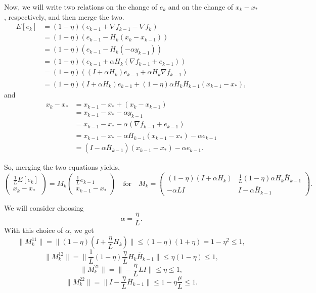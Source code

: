 \documentclass[11pt]{article}
\begin{document}
\noindent 
Now, we will write two relations on the change of $e_k$ and on the change of $x_k-x_\ast$, respectively, and then merge the two.
 \begin{align*}
  E[e_k] &= (1-\eta)(e_{k-1} + \nabla f_{k-1} - \nabla f_k)\\
  &= (1-\eta)(e_{k-1} - H_k(x_k-x_{k-1}))\\
  &= (1-\eta)(e_{k-1} - H_k(-\alpha y_{k-1}))\\
  &= (1-\eta)\left(e_{k-1} + \alpha H_k (\nabla f_{k-1}+e_{k-1})\right)\\
  &= (1-\eta)\left((I+\alpha H_k)e_{k-1} + \alpha H_k\nabla f_{k-1}\right)\\ 
  &= (1-\eta)(I+\alpha H_k)e_{k-1} + (1-\eta)\alpha H_k\bar H_{k-1}(x_{k-1}-x_\ast),
 \end{align*}
and
 \begin{align*}
  x_k-x_\ast &= x_{k-1}-x_\ast + (x_k-x_{k-1})\\
  &=x_{k-1}-x_\ast -\alpha y_{k-1}\\
  &=x_{k-1}-x_\ast -\alpha (\nabla f_{k-1} + e_{k-1})\\
  &=x_{k-1}-x_\ast -\alpha\bar H_{k-1}(x_{k-1}-x_\ast) -\alpha e_{k-1}\\
  &=(I-\alpha\bar H_{k-1})(x_{k-1}-x_\ast) -\alpha e_{k-1}.
 \end{align*}
 
\bigskip

\noindent  
So, merging the two equations yields,
\[
 \begin{pmatrix} \displaystyle\frac{1}{L}E[e_k] \\ x_k-x_\ast \end{pmatrix} 
= M_k
 \begin{pmatrix} \displaystyle\frac{1}{L}e_{k-1} \\ x_{k-1}-x_\ast \end{pmatrix}  \quad\mbox{for}\quad 
 M_k = \begin{pmatrix} (1-\eta)(I+\alpha H_k) & \displaystyle\frac{1}{L} (1-\eta)\alpha H_k\bar H_{k-1}\\  
                   -\alpha LI  & I-\alpha\bar H_{k-1} \end{pmatrix}.                   
\]

\bigskip
\noindent
We will consider choosing 
\[
 \alpha = \frac{\eta}{L}.
\]
With this choice of $\alpha$, we get
\[
 \|M_k^{11}\|= \|(1-\eta)(I+\frac{\eta}{L}H_k)\|\leq (1-\eta)(1+\eta) = 1-\eta^2 \leq 1,
\]
\[
 \|M_k^{12}\|= \|\frac{1}{L} (1-\eta)\frac{\eta}{L} H_k\bar H_{k-1}\|\leq \eta(1-\eta)\leq 1,
\]
\[
 \|M_k^{21}\|= \|-\frac{\eta}{L} LI \|\leq \eta \leq 1,
\]
\[
 \|M_k^{22}\|= \|I-\frac{\eta}{L}\bar H_{k-1} \|\leq 1-\eta\frac{\mu}{L} \leq 1.
\]
\end{document}
